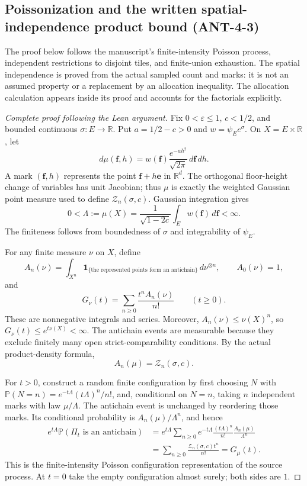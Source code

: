 \subsection{Poissonization and the written spatial-independence product bound (ANT-4-3)}
\label{leanproof:ANT-4-3}

The proof below follows the manuscript's finite-intensity Poisson process,
independent restrictions to disjoint tiles, and finite-union exhaustion.
The spatial independence is proved from the actual sampled count and marks:
it is not an assumed property or a replacement by an allocation inequality.
The allocation calculation appears inside its proof and accounts for the
factorials explicitly.

\begin{proof}[Complete proof following the Lean argument]
Fix \(0<\varepsilon\le1\), \(c<1/2\), and bounded continuous
\(\sigma:E\to\mathbb R\). Put \(a=1/2-c>0\) and
\(w=\psi_Ee^\sigma\). On \(X=E\times\mathbb R\), let
\[
 d\mu(\mathbf f,h)
    =w(\mathbf f)\frac{e^{-ah^2}}{\sqrt{2\pi}}\,d\mathbf f\,dh.
\]
A mark \((\mathbf f,h)\) represents the point
\(\mathbf f+h\mathbf e\) in \(\mathbb R^d\).
The orthogonal floor-height change of variables has unit Jacobian;
thus \(\mu\) is exactly the weighted Gaussian point measure used to
define \(\mathcal Z_n(\sigma,c)\). Gaussian integration gives
\[
 0<\Lambda:=\mu(X)
    =\frac{1}{\sqrt{1-2c}}\int_Ew(\mathbf f)\,d\mathbf f<\infty.
\]
The finiteness follows from boundedness of \(\sigma\) and
integrability of \(\psi_E\).

For any finite measure \(\nu\) on \(X\), define
\[
 A_n(\nu)=
   \int_{X^n}\mathbf 1_{\{\text{the represented points form an antichain}\}}
                  \,d\nu^{\otimes n},\qquad A_0(\nu)=1,
\]
and
\[
 G_\nu(t)=\sum_{n\ge0}\frac{t^nA_n(\nu)}{n!}\qquad(t\ge0).
\]
These are nonnegative integrals and series. Moreover,
\(A_n(\nu)\le\nu(X)^n\), so \(G_\nu(t)\le e^{t\nu(X)}<\infty\).
The antichain events are measurable because they exclude finitely
many open strict-comparability conditions.
By the actual product-density formula,
\[
 A_n(\mu)=\mathcal Z_n(\sigma,c).
\]

For \(t>0\), construct a random finite configuration by first choosing
\(N\) with
\(\mathbb P(N=n)=e^{-t\Lambda}(t\Lambda)^n/n!\), and, conditional on
\(N=n\), taking \(n\) independent marks with law \(\mu/\Lambda\).
The antichain event is unchanged by reordering those marks. Its
conditional probability is \(A_n(\mu)/\Lambda^n\), and hence
\[
 \begin{aligned}
 e^{t\Lambda}\mathbb P(\Pi_t\text{ is an antichain})
 &=e^{t\Lambda}\sum_{n\ge0}
      e^{-t\Lambda}\frac{(t\Lambda)^n}{n!}
      \frac{A_n(\mu)}{\Lambda^n}\\
 &=\sum_{n\ge0}\frac{\mathcal Z_n(\sigma,c)t^n}{n!}
 =G_\mu(t).
 \end{aligned}
\]
This is the finite-intensity Poisson configuration representation of
the source process. At \(t=0\) take the empty configuration almost
surely; both sides are \(1\).


\end{proof}
